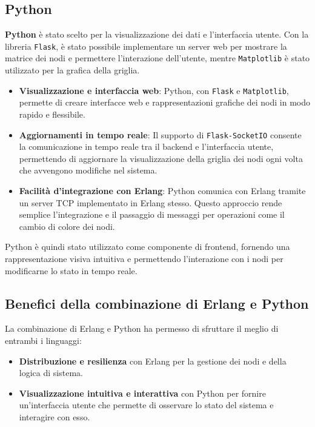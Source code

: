 \documentclass[12pt, a4paper]{report}
\begin{document}
\subsection{Python}

\textbf{Python} è stato scelto per la visualizzazione dei dati e l’interfaccia utente. Con la libreria \texttt{Flask}, è stato possibile implementare un server web per mostrare la matrice dei nodi e permettere l'interazione dell'utente, mentre \texttt{Matplotlib} è stato utilizzato per la grafica della griglia.

\begin{itemize}
    \item \textbf{Visualizzazione e interfaccia web}: Python, con \texttt{Flask} e \texttt{Matplotlib}, permette di creare interfacce web e rappresentazioni grafiche dei nodi in modo rapido e flessibile.
    \item \textbf{Aggiornamenti in tempo reale}: Il supporto di \texttt{Flask-SocketIO} consente la comunicazione in tempo reale tra il backend e l'interfaccia utente, permettendo di aggiornare la visualizzazione della griglia dei nodi ogni volta che avvengono modifiche nel sistema.
    \item \textbf{Facilità d'integrazione con Erlang}: Python comunica con Erlang tramite un server TCP implementato in Erlang stesso. Questo approccio rende semplice l'integrazione e il passaggio di messaggi per operazioni come il cambio di colore dei nodi.
\end{itemize}

Python è quindi stato utilizzato come componente di frontend, fornendo una rappresentazione visiva intuitiva e permettendo l'interazione con i nodi per modificarne lo stato in tempo reale.

\subsection{Benefici della combinazione di Erlang e Python}

La combinazione di Erlang e Python ha permesso di sfruttare il meglio di entrambi i linguaggi:
\begin{itemize}
    \item \textbf{Distribuzione e resilienza} con Erlang per la gestione dei nodi e della logica di sistema.
    \item \textbf{Visualizzazione intuitiva e interattiva} con Python per fornire un’interfaccia utente che permette di osservare lo stato del sistema e interagire con esso.
\end{itemize}
\end{document}
